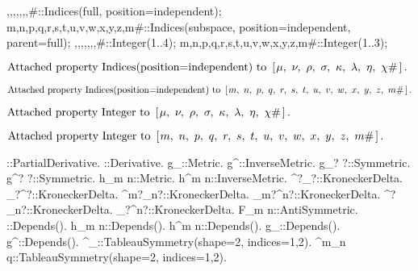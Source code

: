 \documentclass[10pt]{article}
\newcommand\brwrap[3]{%
  \setbox0=\hbox{$#2$}
  \left#1\vbox to \the\ht0{\hbox to 0pt{}}\right.\kern-.2em
  \begingroup #2\endgroup\kern-.15em
  \left.\vbox to \the\ht0{\hbox to 0pt{}}\right#3
}
\begin{document}
\begin{python}
{\mu,\nu,\rho,\sigma,\kappa,\lambda,\eta,\chi#}::Indices(full, position=independent);
{m,n,p,q,r,s,t,u,v,w,x,y,z,m#}::Indices(subspace, position=independent, parent=full);
{\mu,\nu,\rho,\sigma,\kappa,\lambda,\eta,\chi#}::Integer(1..4);
{m,n,p,q,r,s,t,u,v,w,x,y,z,m#}::Integer(1..3);
\end{python}
\begin{adjustwidth}{1em}{0cm}${}\text{Attached property Indices(position=independent) to~}\brwrap{[}{\mu,~\discretionary{}{}{} \nu,~\discretionary{}{}{} \rho,~\discretionary{}{}{} \sigma,~\discretionary{}{}{} \kappa,~\discretionary{}{}{} \lambda,~\discretionary{}{}{} \eta,~\discretionary{}{}{} \chi\#}{]}.$\end{adjustwidth}
\begin{adjustwidth}{1em}{0cm}${}\text{Attached property Indices(position=independent) to~}\brwrap{[}{m,~\discretionary{}{}{} n,~\discretionary{}{}{} p,~\discretionary{}{}{} q,~\discretionary{}{}{} r,~\discretionary{}{}{} s,~\discretionary{}{}{} t,~\discretionary{}{}{} u,~\discretionary{}{}{} v,~\discretionary{}{}{} w,~\discretionary{}{}{} x,~\discretionary{}{}{} y,~\discretionary{}{}{} z,~\discretionary{}{}{} m\#}{]}.$\end{adjustwidth}
\begin{adjustwidth}{1em}{0cm}${}\text{Attached property Integer to~}\brwrap{[}{\mu,~\discretionary{}{}{} \nu,~\discretionary{}{}{} \rho,~\discretionary{}{}{} \sigma,~\discretionary{}{}{} \kappa,~\discretionary{}{}{} \lambda,~\discretionary{}{}{} \eta,~\discretionary{}{}{} \chi\#}{]}.$\end{adjustwidth}
\begin{adjustwidth}{1em}{0cm}${}\text{Attached property Integer to~}\brwrap{[}{m,~\discretionary{}{}{} n,~\discretionary{}{}{} p,~\discretionary{}{}{} q,~\discretionary{}{}{} r,~\discretionary{}{}{} s,~\discretionary{}{}{} t,~\discretionary{}{}{} u,~\discretionary{}{}{} v,~\discretionary{}{}{} w,~\discretionary{}{}{} x,~\discretionary{}{}{} y,~\discretionary{}{}{} z,~\discretionary{}{}{} m\#}{]}.$\end{adjustwidth}
\begin{python}
\partial{#}::PartialDerivative.
\nabla{#}::Derivative.
g_{\mu\nu}::Metric.
g^{\mu\nu}::InverseMetric.
g_{\mu? \nu?}::Symmetric.
g^{\mu? \nu?}::Symmetric.
h_{m n}::Metric.
h^{m n}::InverseMetric.
\delta^{\mu?}_{\nu?}::KroneckerDelta.
\delta_{\mu?}^{\nu?}::KroneckerDelta.
\delta^{m?}_{n?}::KroneckerDelta.
\delta_{m?}^{n?}::KroneckerDelta.
\delta^{\mu?}_{n?}::KroneckerDelta.
\delta_{\mu?}^{n?}::KroneckerDelta.
F_{m n}::AntiSymmetric.
\pi::Depends(\nabla{#}).
h_{m n}::Depends(\partial{#}).
h^{m n}::Depends(\partial{#}).
g_{\mu\nu}::Depends(\partial{#}).
g^{\mu\nu}::Depends(\partial{#}).
\Gamma^{\alpha}_{\mu\nu}::TableauSymmetry(shape={2}, indices={1,2}).
\Gamma^{m}_{n q}::TableauSymmetry(shape={2}, indices={1,2}).
\end{python}
\end{document}
